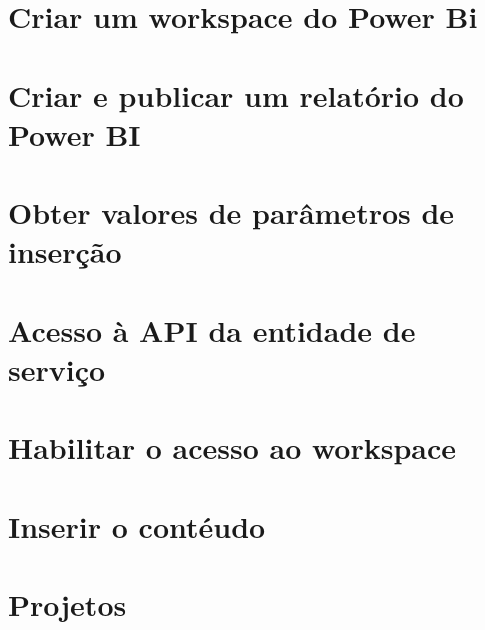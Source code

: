 \documentclass[
	12pt,				%
	openright,			%
	twoside,			%
	a4paper,			%
	english,			%
	french,				%
	spanish,			%
	brazil,				%
	]{abntex2}
\begin{document}
	\chapter{Criar um workspace do Power Bi}
	\chapter{Criar e publicar um relatório do Power BI}
	\chapter{Obter valores de parâmetros de inserção}
	\chapter{Acesso à API da entidade de serviço}
	\chapter{Habilitar o acesso ao workspace}
	\chapter{Inserir o contéudo}
	
	\chapter*[Projetos]{Projetos}
	
\end{document}
